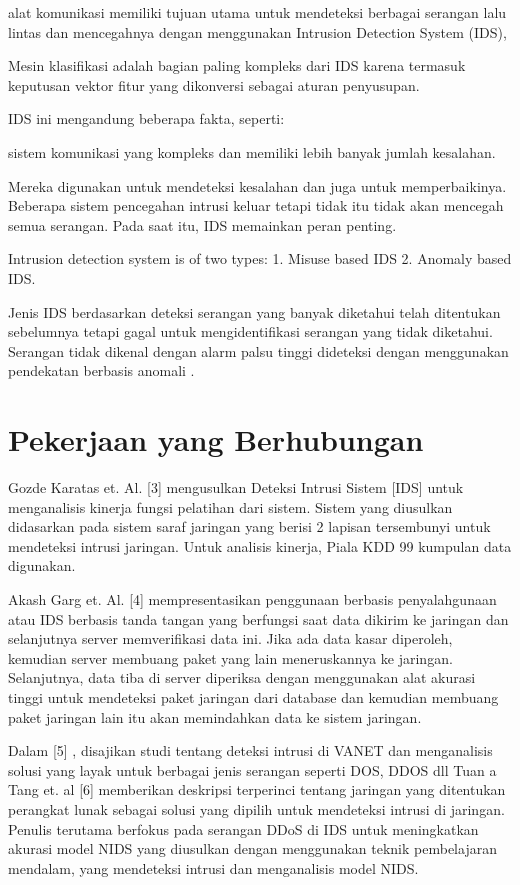 \documentclass[conference]{IEEEtran}
\begin{document}
    alat komunikasi memiliki tujuan utama untuk mendeteksi berbagai serangan lalu lintas dan mencegahnya dengan menggunakan Intrusion Detection System (IDS),
    
    Mesin klasifikasi adalah bagian paling kompleks dari IDS karena termasuk keputusan vektor fitur yang dikonversi sebagai aturan penyusupan.
    
     IDS ini mengandung beberapa fakta, seperti:
     
     sistem komunikasi yang kompleks dan memiliki lebih banyak jumlah kesalahan.
     
     Mereka digunakan untuk mendeteksi kesalahan dan juga untuk memperbaikinya. Beberapa sistem pencegahan intrusi keluar tetapi tidak itu tidak akan mencegah semua serangan. Pada saat itu, IDS memainkan peran penting.
     
     Intrusion detection system is of two types: 1. Misuse based IDS 2. Anomaly based IDS.
     
     Jenis IDS berdasarkan deteksi serangan yang banyak diketahui telah ditentukan sebelumnya tetapi gagal untuk mengidentifikasi serangan yang tidak diketahui. Serangan tidak dikenal dengan alarm palsu tinggi dideteksi dengan menggunakan pendekatan berbasis anomali \cite{aydin2009hybrid}.
     
\section{Pekerjaan yang Berhubungan}
    Gozde Karatas et. Al. [3] \cite{karatas2018neural} mengusulkan Deteksi Intrusi Sistem [IDS] untuk menganalisis kinerja fungsi pelatihan dari sistem. Sistem yang diusulkan didasarkan pada sistem saraf jaringan yang berisi 2 lapisan tersembunyi untuk mendeteksi intrusi jaringan. Untuk analisis kinerja, Piala KDD 99 kumpulan data digunakan.
    
    Akash Garg et. Al. [4] \cite{garg2016hybrid} mempresentasikan penggunaan berbasis penyalahgunaan atau IDS berbasis tanda tangan yang berfungsi saat data dikirim ke jaringan dan selanjutnya server memverifikasi data ini. Jika ada data kasar diperoleh, kemudian server membuang paket yang lain meneruskannya ke jaringan. Selanjutnya, data tiba di server diperiksa dengan menggunakan alat akurasi tinggi untuk mendeteksi paket jaringan dari database dan kemudian membuang paket jaringan lain itu akan memindahkan data ke sistem jaringan.
    
    Dalam [5] \cite{gonccalves2019systematic}, disajikan studi tentang deteksi intrusi di VANET dan menganalisis solusi yang layak untuk berbagai jenis serangan seperti DOS, DDOS dll Tuan a Tang et. al [6] \cite{tang2016deep} memberikan deskripsi terperinci tentang jaringan yang ditentukan perangkat lunak sebagai solusi yang dipilih untuk mendeteksi intrusi di jaringan. Penulis terutama berfokus pada serangan DDoS di IDS untuk meningkatkan akurasi model NIDS yang diusulkan dengan menggunakan teknik pembelajaran mendalam, yang mendeteksi intrusi dan menganalisis model NIDS.
\end{document}
